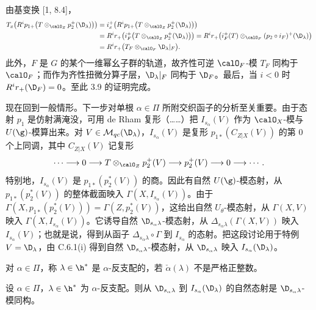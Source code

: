 由基变换 [1, 8.4]，
{\small
\begin{align*}
T_x\bigl(R^ip_{1+}\bigl(T\otimes_{\calO_Z}p_2^+(\D_\lambda)\bigr)\bigr)
&=i_x^+\bigl(R^ip_{1+}\bigl(T\otimes_{\calO_Z}p_2^+(\D_\lambda)\bigr)\bigr)\\
&=R^ir_+\bigl(i_F^+\bigl(T\otimes_{\calO_Z}p_2^+(\D_\lambda)\bigr)\bigr)
=R^ir_+\bigl(i_F^+(T)\otimes_{\calO_F}(p_2\circ i_F)^+(\D_\lambda)\bigr)\\
&=R^ir_+\bigl(T_F\otimes_{\calO_F}\D_\lambda|_F\bigr).
\end{align*}}
此外，$F$ 是 $G$ 的某个一维幂幺子群的轨道，故齐性可逆 $\calO_F$-模 $T_F$ 同构于 $\calO_F$；而作为齐性扭微分算子层，$\D_\lambda|_F$ 同构于 $\D_F$。最后，当 $i<0$ 时 $R^ir_+(\D_F)=0$。至此 3.9 的证明完成。

现在回到一般情形。下一步对单根 $\alpha\in\Pi$ 所附交织函子的分析至关重要。由于态射 $p_1$ 是仿射满淹没，可用 de Rham 复形（……）把 $I_{s_\alpha}(V)$ 作为 $\calO_X$-模与 $U(\g)$-模算出来。对 $V\in\mathcal{M}_{qc}(\D_\lambda)$，$I_{s_\alpha}(V)$ 是复形 $p_{1*}(C_{Z|X}(V))$ 的第 0 个上同调，其中 $C_{Z|X}(V)$ 记复形
$$\cdots\longrightarrow0\longrightarrow T\otimes_{\calO_Z}p_2^+(V)\longrightarrow p_2^+(V)\longrightarrow0\longrightarrow\cdots.$$
特别地，$I_{s_\alpha}(V)$ 是 $p_{1*}(p_2^*(V))$ 的商。因此有自然 $U(\g)$-模态射，从 $p_{1*}(p_2^*(V))$ 的整体截面映入 $\Gamma(X,I_{s_\alpha}(V))$。由于 $\Gamma(X,p_{1*}(p_2^*(V)))=\Gamma(Z,p_2^*(V))$，这给出自然 $U_\theta$-模态射，从 $\Gamma(X,V)$ 映入 $\Gamma(X,I_{s_\alpha}(V))$。它诱导自然 $\D_{s_\alpha\lambda}$-模态射，从 $\Delta_{s_\alpha\lambda}(\Gamma(X,V))$ 映入 $I_{s_\alpha}(V)$；也就是说，得到从函子 $\Delta_{s_\alpha\lambda}\circ\Gamma$ 到 $I_{s_\alpha}$ 的态射。把这段讨论用于特例 $V=\D_\lambda$，由 C.6.1(i) 得到自然 $\D_{s_\alpha\lambda}$-模态射，从 $\D_{s_\alpha\lambda}$ 映入 $I_{s_\alpha}(\D_\lambda)$。

对 $\alpha\in\Pi$，称 $\lambda\in\h^*$ 是 $\alpha$-反支配的，若 $\check\alpha(\lambda)$ 不是严格正整数。

\begin{lemma}\label{lem:03.3.11}
设 $\alpha\in\Pi$，$\lambda\in\h^*$ 为 $\alpha$-反支配。则从 $\D_{s_\alpha\lambda}$ 到 $I_{s_\alpha}(\D_\lambda)$ 的自然态射是 $\D_{s_\alpha\lambda}$-模同构。
\end{lemma}


